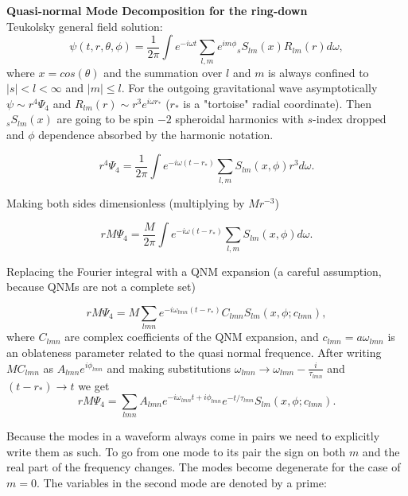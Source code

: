 \documentclass[10pt]{article}
\begin{document}
\noindent
{\large\bf Quasi-normal Mode Decomposition for the ring-down} \\

Teukolsky general field solution:
\begin{equation}
\psi(t,r,\theta,\phi) = \frac{1}{2\pi} \int {e^{-i\omega t} \sum_{l,m} e^{im\phi} {}_sS_{lm}(x)R_{lm}(r) d\omega },
\end{equation}
where $x=cos(\theta)$ and the summation over $l$ and $m$ is always confined to $|s|< l < \infty$ and $|m| \leq l$. For the outgoing gravitational wave asymptotically $\psi \sim r^4\Psi_4$ and $R_{lm}(r) \sim r^3e^{i\omega r_*}$ ($r_*$ is a "tortoise" radial coordinate). Then ${}_sS_{lm}(x)$ are going to be spin $-2$ spheroidal harmonics with $s$-index dropped and $\phi$ dependence absorbed by the harmonic notation.

\begin{equation}
r^4\Psi_4 = \frac{1}{2\pi} \int {e^{-i\omega (t-r_*)} \sum_{l,m} S_{lm}(x,\phi) r^3 d\omega }.
\end{equation}

\noindent
Making both sides dimensionless (multiplying by $Mr^{-3}$)

\begin{equation}
rM\Psi_4 = \frac{M}{2\pi} \int {e^{-i\omega (t-r_*)} \sum_{l,m} S_{lm}(x,\phi) d\omega }.
\end{equation}

\noindent
Replacing the Fourier integral with a QNM expansion (a careful assumption, because QNMs are not a complete set)

\begin{equation}
rM\Psi_4 = M \sum_{lmn}e^{-i\omega_{lmn} (t-r_*)} C_{lmn} S_{lm}(x,\phi ; c_{lmn}), 
\end{equation}
where $C_{lmn}$ are complex coefficients of the QNM expansion, and $c_{lmn}=a\omega_{lmn}$ is an oblateness parameter related to the quasi normal frequence. After writing $MC_{lmn}$ as $A_{lmn}e^{i\phi_{lmn}}$ and making substitutions $\omega_{lmn} \rightarrow  \omega_{lmn} - \frac{i}{\tau_{lmn}}$ and $(t-r_*) \rightarrow t$ we get
\begin{equation}
rM\Psi_4 = \sum_{lmn} A_{lmn} e^{-i\omega_{lmn}t+i\phi_{lmn}}e^{-t/\tau_{lmn}} S_{lm}(x,\phi ; c_{lmn}).
\end{equation}

\noindent
Because the modes in a waveform always come in pairs we need to explicitly write them as such. To go from one mode to its pair the sign on both $m$ and the real part of the frequency changes. The modes become degenerate for the case of $m=0$. The variables in the second mode are denoted by a prime:
\end{document}
